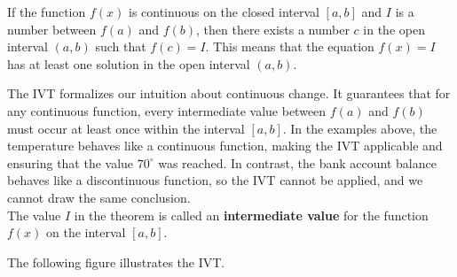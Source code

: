 \documentclass[handout]{ximera}
\begin{document}
\begin{theorem}
If the function $f(x)$ is continuous on the closed interval $[a, b]$ 
and $I$ is a number between $f(a)$ and $f(b)$,
then there exists a number $c$ in the open interval $(a,b)$ such that $f(c) = I$.
This means that the equation $f(x) = I$ has at least one solution in the open interval $(a,b)$. 
\end{theorem}
The IVT formalizes our intuition about continuous change. It guarantees that for any continuous function, 
every intermediate value between \( f(a) \) and \( f(b) \) must occur at least once within the interval \([a, b]\).
In the examples above, the temperature behaves like a continuous function, making the IVT applicable and ensuring that the value \(70^\circ\) was reached. 
In contrast, the bank account balance behaves like a discontinuous function, so the IVT cannot be applied, and we cannot draw the same conclusion.\\
The value $I$ in the theorem is called an \textbf{intermediate value} for the function $f(x)$ 
on the interval $[a,b]$. 

The following figure illustrates the IVT.

\begin{image}
\end{image}
\end{document}
